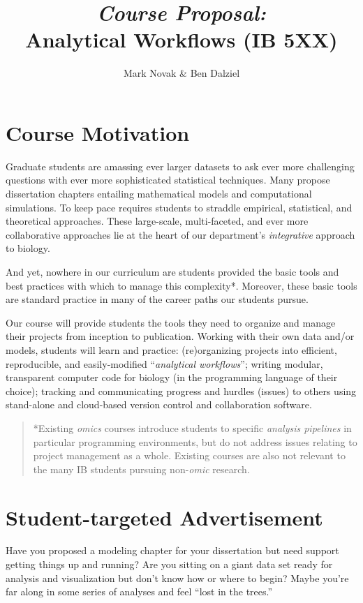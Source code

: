 \documentclass[10pt]{article}
\author{Mark Novak \& Ben Dalziel}
\title{\emph{Course Proposal:}\\Analytical Workflows (IB 5XX)}
\date{}
\begin{document}
\maketitle

\section*{Course Motivation}
Graduate students are amassing ever larger datasets to ask ever more challenging questions with ever more sophisticated  statistical techniques. Many propose dissertation chapters entailing mathematical models and computational simulations. To keep pace requires students to straddle empirical, statistical, and theoretical approaches. These large-scale, multi-faceted, and ever more collaborative approaches lie at the heart of our department's \emph{integrative} approach to biology.  

And yet, nowhere in our curriculum are students provided the basic tools and best practices with which to manage this complexity*. Moreover, these basic tools are standard practice in many of the career paths our students pursue.

Our course will provide students the tools they need to organize and manage their projects from inception to publication.  Working with their own data and/or models, students will learn and practice: (re)organizing projects into efficient, reproducible, and easily-modified ``\emph{analytical workflows}''; writing modular, transparent computer code for biology (in the programming language of their choice); tracking and communicating progress and hurdles (issues) to others using stand-alone and cloud-based version control and collaboration software.

\begin{quote}
	*Existing \emph{omics} courses introduce students to specific \emph{analysis pipelines} in particular programming environments, but do not address issues relating to project management as a whole. Existing courses are also not relevant to the many IB students pursuing non-\emph{omic} research.
\end{quote}


\section*{Student-targeted Advertisement}
Have you proposed a modeling chapter for your dissertation but need support getting things up and running?  Are you sitting on a giant data set ready for analysis and visualization but don't know how or where to begin?  Maybe you're far along in some series of analyses and feel ``lost in the trees.''
\end{document}
